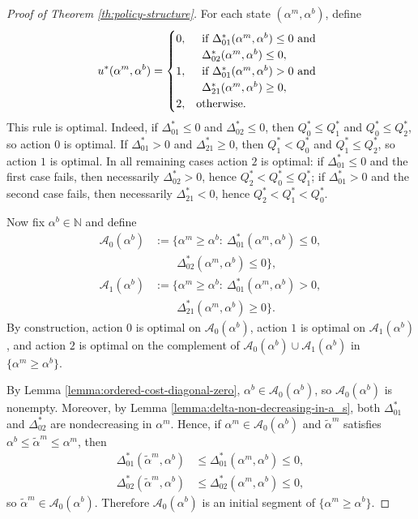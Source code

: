\documentclass[10pt,a4paper]{amsart}
\begin{document}
\begin{proof}[Proof of Theorem \ref{th:policy-structure}]
For each state $(\alpha^m,\alpha^b)$, define
\[
u^*(\alpha^m,\alpha^b)=
\begin{cases}
0, & \begin{array}[t]{l}
\text{if } \Delta^*_{01}(\alpha^m,\alpha^b)\le 0\text{ and}\\
\Delta^*_{02}(\alpha^m,\alpha^b)\le 0,
\end{array}\\[0.4em]
1, & \begin{array}[t]{l}
\text{if } \Delta^*_{01}(\alpha^m,\alpha^b)>0\text{ and}\\
\Delta^*_{21}(\alpha^m,\alpha^b)\ge 0,
\end{array}\\[0.4em]
2, & \text{otherwise.}
\end{cases}
\]
This rule is optimal. Indeed, if $\Delta^*_{01}\le 0$ and $\Delta^*_{02}\le 0$, then $Q_0^*\le Q_1^*$ and $Q_0^*\le Q_2^*$, so action $0$ is optimal. If $\Delta^*_{01}>0$ and $\Delta^*_{21}\ge 0$, then $Q_1^*<Q_0^*$ and $Q_1^*\le Q_2^*$, so action $1$ is optimal. In all remaining cases action $2$ is optimal: if $\Delta^*_{01}\le 0$ and the first case fails, then necessarily $\Delta^*_{02}>0$, hence $Q_2^*<Q_0^*\le Q_1^*$; if $\Delta^*_{01}>0$ and the second case fails, then necessarily $\Delta^*_{21}<0$, hence $Q_2^*<Q_1^*<Q_0^*$.

Now fix $\alpha^b\in\mathbb N$ and define
\begin{align*}
\mathcal A_0(\alpha^b)
&:=\{\alpha^m\ge \alpha^b:\ \Delta^*_{01}(\alpha^m,\alpha^b)\le 0,\\
&\qquad \Delta^*_{02}(\alpha^m,\alpha^b)\le 0\},\\
\mathcal A_1(\alpha^b)
&:=\{\alpha^m\ge \alpha^b:\ \Delta^*_{01}(\alpha^m,\alpha^b)>0,\\
&\qquad \Delta^*_{21}(\alpha^m,\alpha^b)\ge 0\}.
\end{align*}
By construction, action $0$ is optimal on $\mathcal A_0(\alpha^b)$, action $1$ is optimal on
$\mathcal A_1(\alpha^b)$, and action $2$ is optimal on the complement of
$\mathcal A_0(\alpha^b)\cup \mathcal A_1(\alpha^b)$ in $\{\alpha^m\ge \alpha^b\}$.

By Lemma \ref{lemma:ordered-cost-diagonal-zero}, $\alpha^b\in\mathcal A_0(\alpha^b)$, so $\mathcal A_0(\alpha^b)$ is nonempty. Moreover, by Lemma \ref{lemma:delta-non-decreasing-in-a_s}, both $\Delta^*_{01}$ and $\Delta^*_{02}$ are nondecreasing in $\alpha^m$. Hence, if $\alpha^m\in\mathcal A_0(\alpha^b)$ and $\tilde\alpha^m$ satisfies $\alpha^b\le \tilde\alpha^m\le \alpha^m$, then
\begin{align*}
\Delta^*_{01}(\tilde\alpha^m,\alpha^b)
&\le \Delta^*_{01}(\alpha^m,\alpha^b)\le 0,\\
\Delta^*_{02}(\tilde\alpha^m,\alpha^b)
&\le \Delta^*_{02}(\alpha^m,\alpha^b)\le 0,
\end{align*}
so $\tilde\alpha^m\in\mathcal A_0(\alpha^b)$. Therefore $\mathcal A_0(\alpha^b)$ is an initial
segment of $\{\alpha^m\ge \alpha^b\}$.


\end{proof}
\end{document}
